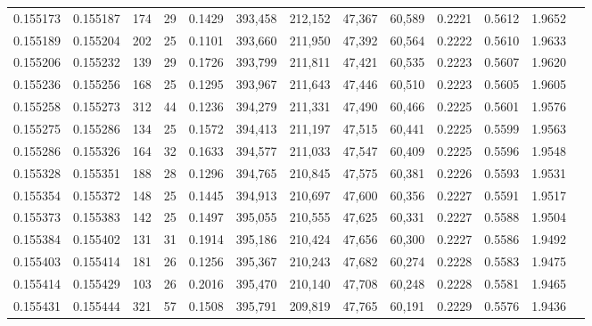 \begin{tabular}{rrrrrrrrrrrrr}
0.155173 & 0.155187 &   174 &  29 &                                     0.1429 & 393,458 & 212,152 &  47,367 &  60,589 & 0.2221 & 0.5612 & 1.9652 \\
0.155189 & 0.155204 &   202 &  25 &                                     0.1101 & 393,660 & 211,950 &  47,392 &  60,564 & 0.2222 & 0.5610 & 1.9633 \\
0.155206 & 0.155232 &   139 &  29 &                                     0.1726 & 393,799 & 211,811 &  47,421 &  60,535 & 0.2223 & 0.5607 & 1.9620 \\
0.155236 & 0.155256 &   168 &  25 &                                     0.1295 & 393,967 & 211,643 &  47,446 &  60,510 & 0.2223 & 0.5605 & 1.9605 \\
0.155258 & 0.155273 &   312 &  44 &                                     0.1236 & 394,279 & 211,331 &  47,490 &  60,466 & 0.2225 & 0.5601 & 1.9576 \\
0.155275 & 0.155286 &   134 &  25 &                                     0.1572 & 394,413 & 211,197 &  47,515 &  60,441 & 0.2225 & 0.5599 & 1.9563 \\
0.155286 & 0.155326 &   164 &  32 &                                     0.1633 & 394,577 & 211,033 &  47,547 &  60,409 & 0.2225 & 0.5596 & 1.9548 \\
0.155328 & 0.155351 &   188 &  28 &                                     0.1296 & 394,765 & 210,845 &  47,575 &  60,381 & 0.2226 & 0.5593 & 1.9531 \\
0.155354 & 0.155372 &   148 &  25 &                                     0.1445 & 394,913 & 210,697 &  47,600 &  60,356 & 0.2227 & 0.5591 & 1.9517 \\
0.155373 & 0.155383 &   142 &  25 &                                     0.1497 & 395,055 & 210,555 &  47,625 &  60,331 & 0.2227 & 0.5588 & 1.9504 \\
0.155384 & 0.155402 &   131 &  31 &                                     0.1914 & 395,186 & 210,424 &  47,656 &  60,300 & 0.2227 & 0.5586 & 1.9492 \\
0.155403 & 0.155414 &   181 &  26 &                                     0.1256 & 395,367 & 210,243 &  47,682 &  60,274 & 0.2228 & 0.5583 & 1.9475 \\
0.155414 & 0.155429 &   103 &  26 &                                     0.2016 & 395,470 & 210,140 &  47,708 &  60,248 & 0.2228 & 0.5581 & 1.9465 \\
0.155431 & 0.155444 &   321 &  57 &                                     0.1508 & 395,791 & 209,819 &  47,765 &  60,191 & 0.2229 & 0.5576 & 1.9436 \\

\end{tabular}
